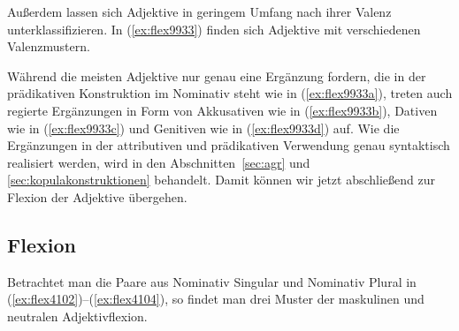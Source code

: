 \begin{exe}
  \ex \label{ex:flex8739}
  \begin{xlist}
  \end{xlist}
\end{exe}

Außerdem lassen sich Adjektive in geringem Umfang nach ihrer Valenz unterklassifizieren.
In (\ref{ex:flex9933}) finden sich Adjektive mit verschiedenen Valenzmustern.


\begin{exe}
  \ex \label{ex:flex9933}
  \begin{xlist}
  \end{xlist}
\end{exe}

Während die meisten Adjektive nur genau eine Ergänzung fordern, die in der prädikativen Konstruktion im Nominativ steht wie in (\ref{ex:flex9933a}), treten auch regierte Ergänzungen in Form von Akkusativen wie in (\ref{ex:flex9933b}), Dativen wie in (\ref{ex:flex9933c}) und Genitiven wie in (\ref{ex:flex9933d}) auf.
Wie die Ergänzungen in der attributiven und prädikativen Verwendung genau syntaktisch realisiert werden, wird in den Abschnitten~\ref{sec:agr} und \ref{sec:kopulakonstruktionen} behandelt.
Damit können wir jetzt abschließend zur Flexion der Adjektive übergehen.

\subsection{Flexion}

\label{sec:adjektivflexion}


Betrachtet man die Paare aus Nominativ Singular und Nominativ Plural in (\ref{ex:flex4102})--(\ref{ex:flex4104}), so findet man drei Muster der maskulinen und neutralen Adjektivflexion.

\begin{exe}
  \ex \label{ex:flex4102}
  \begin{xlist}
  \end{xlist}
  \ex \label{ex:flex4103}
  \begin{xlist}
  \end{xlist}
  \ex \label{ex:flex4104}
  \begin{xlist}
  \end{xlist}
\end{exe}

